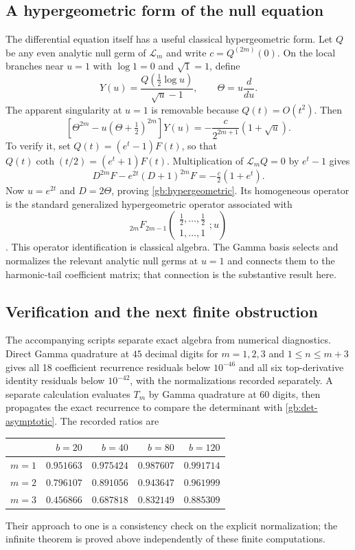 \documentclass[11pt,a4paper]{article}
\numberwithin{equation}{section}
\theoremstyle{definition}
\theoremstyle{remark}
\begin{document}
\subsection{A hypergeometric form of the null equation}

The differential equation itself has a useful classical
hypergeometric form.  Let $Q$ be any even analytic null germ of
$\mathcal L_m$ and write $c=Q^{(2m)}(0)$.  On the local branches
near $u=1$ with $\log1=0$ and $\sqrt1=1$, define
\[
 Y(u)=\frac{Q(\tfrac12\log u)}{\sqrt u-1},\qquad
                    \Theta=u\frac{d}{du}.
\]
The apparent singularity at $u=1$ is removable because $Q(t)=O(t^2)$.
Then
\begin{equation}\label{gb:hypergeometric}
 \left[\Theta^{2m}-u(\Theta+\tfrac12)^{2m}\right]Y(u)
            =-\frac{c}{2^{2m+1}}(1+\sqrt u).
\end{equation}
To verify it, set $Q(t)=(e^t-1)F(t)$, so that
$Q(t)\coth(t/2)=(e^t+1)F(t)$.  Multiplication of
$\mathcal L_mQ=0$ by $e^t-1$ gives
\[
 D^{2m}F-e^{2t}(D+1)^{2m}F=-\tfrac c2(1+e^t).
\]
Now $u=e^{2t}$ and $D=2\Theta$, proving
\eqref{gb:hypergeometric}.  Its homogeneous operator is the standard
generalized hypergeometric operator associated with
\[
 {}_{2m}F_{2m-1}
 \left(\begin{matrix}\tfrac12,\ldots,\tfrac12\\1,\ldots,1\end{matrix};u\right)
\]
\cite{dlmf-hypergeometric}.  This operator identification is classical
algebra.  The Gamma basis selects and normalizes the relevant
analytic null germs at $u=1$ and connects them to the harmonic-tail
coefficient matrix; that connection is the substantive result here.

\subsection{Verification and the next finite obstruction}

The accompanying scripts separate exact algebra from numerical
diagnostics.  Direct Gamma quadrature at $45$ decimal digits for
$m=1,2,3$ and $1\le n\le m+3$ gives all 18 coefficient recurrence
residuals below $10^{-46}$ and all six top-derivative identity
residuals below $10^{-42}$, with the normalizations recorded
separately. A separate calculation evaluates $T_m$
by Gamma quadrature at $60$ digits, then propagates the exact
recurrence to compare the determinant with
\eqref{gb:det-asymptotic}.  The recorded ratios are
\begin{center}
\begin{tabular}{@{}crrrr@{}}
\toprule
 & $b=20$ & $b=40$ & $b=80$ & $b=120$\\
\midrule
$m=1$ & $0.951663$ & $0.975424$ & $0.987607$ & $0.991714$\\
$m=2$ & $0.796107$ & $0.891056$ & $0.943647$ & $0.961999$\\
$m=3$ & $0.456866$ & $0.687818$ & $0.832149$ & $0.885309$\\
\bottomrule
\end{tabular}
\end{center}
Their approach to one is a consistency check on the explicit
normalization; the infinite theorem is proved above independently
of these finite computations.
\end{document}
